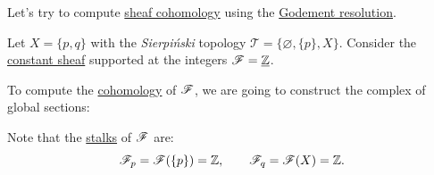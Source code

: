 \documentclass[../../main]{subfiles}
\begin{document}
\begin{example}
  Let's try to compute \hyperref[def:sheaf-cohomology]{sheaf cohomology} using the \hyperref[def:godement-resolution]{Godement resolution}.

  Let \(X = \{p, q\}\) with the \textit{Sierpiński} topology \(\mathcal{T} = \{\varnothing, \{p\}, X\}\).
  Consider the \hyperref[def:constant-sheaf]{constant sheaf} supported at the integers \(\mathscr{F} = \underline{\mathbb{Z}}\).

  To compute the \hyperref[def:sheaf-cohomology]{cohomology} of \(\mathscr{F}\), we are going to construct the complex of global sections:
  \begin{center}
  \end{center}

  Note that the \hyperref[def:stalk]{stalks} of \(\mathscr{F}\) are:
  \begin{equation*}
    \mathscr{F}_{p} = \mathscr{F}(\{p\}) = \mathbb{Z}, \qquad \mathscr{F}_{q} = \mathscr{F}(X) = \mathbb{Z}.
  \end{equation*}


\end{example}
\end{document}
